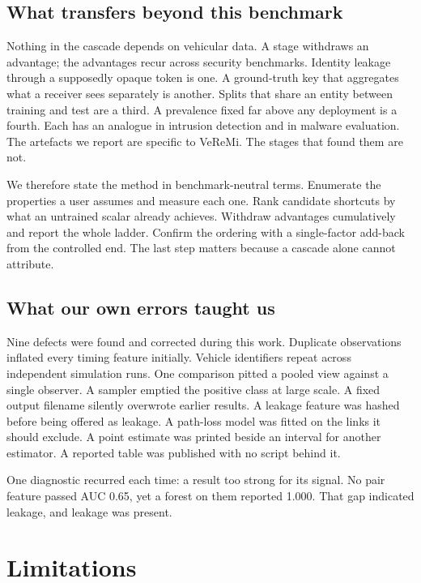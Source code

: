 \documentclass[journal,twoside]{IEEEtran}
\begin{document}
\subsection{What transfers beyond this benchmark}

Nothing in the cascade depends on vehicular data.
A stage withdraws an advantage; the advantages recur across security benchmarks.
Identity leakage through a supposedly opaque token is one.
A ground-truth key that aggregates what a receiver sees separately is another.
Splits that share an entity between training and test are a third.
A prevalence fixed far above any deployment is a fourth.
Each has an analogue in intrusion detection and in malware evaluation.
The artefacts we report are specific to VeReMi.
The stages that found them are not.

We therefore state the method in benchmark-neutral terms.
Enumerate the properties a user assumes and measure each one.
Rank candidate shortcuts by what an untrained scalar already achieves.
Withdraw advantages cumulatively and report the whole ladder.
Confirm the ordering with a single-factor add-back from the controlled end.
The last step matters because a cascade alone cannot attribute.

\subsection{What our own errors taught us}

Nine defects were found and corrected during this work.
Duplicate observations inflated every timing feature initially.
Vehicle identifiers repeat across independent simulation runs.
One comparison pitted a pooled view against a single observer.
A sampler emptied the positive class at large scale.
A fixed output filename silently overwrote earlier results.
A leakage feature was hashed before being offered as leakage.
A path-loss model was fitted on the links it should exclude.
A point estimate was printed beside an interval for another estimator.
A reported table was published with no script behind it.

One diagnostic recurred each time: a result too strong for its signal.
No pair feature passed AUC 0.65, yet a forest on them reported 1.000.
That gap indicated leakage, and leakage was present.

\section{Limitations}
\end{document}
